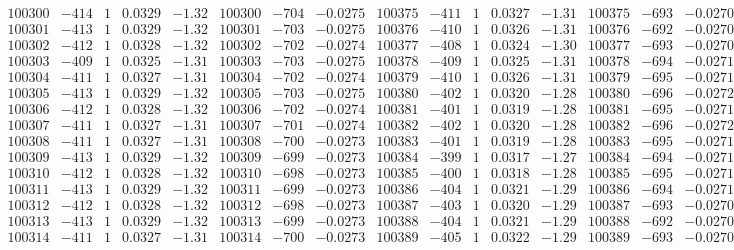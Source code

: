 \documentclass[11pt,reqno,a4letter]{article}
\numberwithin{figure}{section}
\numberwithin{table}{section}
\theoremstyle{plain}
\numberwithin{theorem}{section}
\theoremstyle{definition}
\begin{document}
\begin{table}[ht!]
\begin{equation*}
{\begin{array}{ccccc|ccc||ccccc|ccc}
100300 & -414 & 1 & 0.0329 & -1.32 & 100300 & -704 & -0.0275 & 100375 & -411 & 1 & 0.0327 & -1.31 & 100375 & -693 & -0.0270  \\
100301 & -413 & 1 & 0.0329 & -1.32 & 100301 & -703 & -0.0275 & 100376 & -410 & 1 & 0.0326 & -1.31 & 100376 & -692 & -0.0270  \\
100302 & -412 & 1 & 0.0328 & -1.32 & 100302 & -702 & -0.0274 & 100377 & -408 & 1 & 0.0324 & -1.30 & 100377 & -693 & -0.0270  \\
100303 & -409 & 1 & 0.0325 & -1.31 & 100303 & -703 & -0.0275 & 100378 & -409 & 1 & 0.0325 & -1.31 & 100378 & -694 & -0.0271  \\
100304 & -411 & 1 & 0.0327 & -1.31 & 100304 & -702 & -0.0274 & 100379 & -410 & 1 & 0.0326 & -1.31 & 100379 & -695 & -0.0271  \\
100305 & -413 & 1 & 0.0329 & -1.32 & 100305 & -703 & -0.0275 & 100380 & -402 & 1 & 0.0320 & -1.28 & 100380 & -696 & -0.0272  \\
100306 & -412 & 1 & 0.0328 & -1.32 & 100306 & -702 & -0.0274 & 100381 & -401 & 1 & 0.0319 & -1.28 & 100381 & -695 & -0.0271  \\
100307 & -411 & 1 & 0.0327 & -1.31 & 100307 & -701 & -0.0274 & 100382 & -402 & 1 & 0.0320 & -1.28 & 100382 & -696 & -0.0272  \\
100308 & -411 & 1 & 0.0327 & -1.31 & 100308 & -700 & -0.0273 & 100383 & -401 & 1 & 0.0319 & -1.28 & 100383 & -695 & -0.0271  \\
100309 & -413 & 1 & 0.0329 & -1.32 & 100309 & -699 & -0.0273 & 100384 & -399 & 1 & 0.0317 & -1.27 & 100384 & -694 & -0.0271  \\
100310 & -412 & 1 & 0.0328 & -1.32 & 100310 & -698 & -0.0273 & 100385 & -400 & 1 & 0.0318 & -1.28 & 100385 & -695 & -0.0271  \\
100311 & -413 & 1 & 0.0329 & -1.32 & 100311 & -699 & -0.0273 & 100386 & -404 & 1 & 0.0321 & -1.29 & 100386 & -694 & -0.0271  \\
100312 & -412 & 1 & 0.0328 & -1.32 & 100312 & -698 & -0.0273 & 100387 & -403 & 1 & 0.0320 & -1.29 & 100387 & -693 & -0.0270  \\
100313 & -413 & 1 & 0.0329 & -1.32 & 100313 & -699 & -0.0273 & 100388 & -404 & 1 & 0.0321 & -1.29 & 100388 & -692 & -0.0270  \\
100314 & -411 & 1 & 0.0327 & -1.31 & 100314 & -700 & -0.0273 & 100389 & -405 & 1 & 0.0322 & -1.29 & 100389 & -693 & -0.0270  \\
\end{array}
}
\end{equation*} 

\end{table}
\clearpage 
\end{document}
